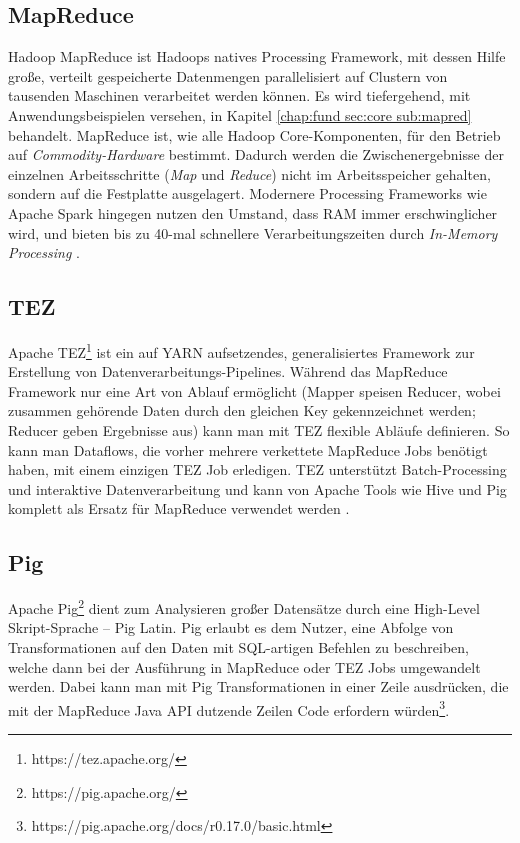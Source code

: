 \subsection{MapReduce}
Hadoop MapReduce ist Hadoops natives Processing Framework, mit dessen Hilfe große, verteilt gespeicherte Datenmengen parallelisiert auf Clustern von tausenden Maschinen verarbeitet werden können. Es wird tiefergehend, mit Anwendungsbeispielen versehen, in Kapitel \ref{chap:fund sec:core sub:mapred} behandelt. MapReduce ist, wie alle Hadoop Core-Komponenten, für den Betrieb auf \textit{Commodity-Hardware} bestimmt. Dadurch werden die Zwischenergebnisse der einzelnen Arbeitsschritte (\textit{Map} und \textit{Reduce}) nicht im Arbeitsspeicher gehalten, sondern auf die Festplatte ausgelagert. Modernere Processing Frameworks wie Apache Spark hingegen nutzen den Umstand, dass RAM immer erschwinglicher wird, und bieten bis zu 40-mal schnellere Verarbeitungszeiten durch \textit{In-Memory Processing} \cite[vgl.][Kap. 3.19]{freiknecht_big_2018}.
\subsection{TEZ}
Apache TEZ\footnote{https://tez.apache.org/} ist ein auf YARN aufsetzendes, generalisiertes Framework zur Erstellung von Datenverarbeitungs-Pipelines. Während das MapReduce Framework nur eine Art von Ablauf ermöglicht (Mapper speisen Reducer, wobei zusammen gehörende Daten durch den gleichen Key gekennzeichnet werden; Reducer geben Ergebnisse aus) kann man mit TEZ flexible Abläufe definieren. So kann man Dataflows, die vorher mehrere verkettete MapReduce Jobs benötigt haben, mit einem einzigen TEZ Job erledigen. TEZ unterstützt Batch-Processing und interaktive Datenverarbeitung und kann von Apache Tools wie Hive und Pig komplett als Ersatz für MapReduce verwendet werden \parencite[vgl.][]{noauthor_apache_nodate-2}.
\subsection{Pig}
Apache Pig\footnote{https://pig.apache.org/} dient zum Analysieren großer Datensätze durch eine High-Level Skript-Sprache -- Pig Latin. Pig erlaubt es dem Nutzer, eine Abfolge von Transformationen auf den Daten mit SQL-artigen Befehlen zu beschreiben, welche dann bei der Ausführung in MapReduce oder TEZ Jobs umgewandelt werden. Dabei kann man mit Pig Transformationen in einer Zeile ausdrücken, die mit der MapReduce Java API dutzende Zeilen Code erfordern würden\footnote{https://pig.apache.org/docs/r0.17.0/basic.html}.

